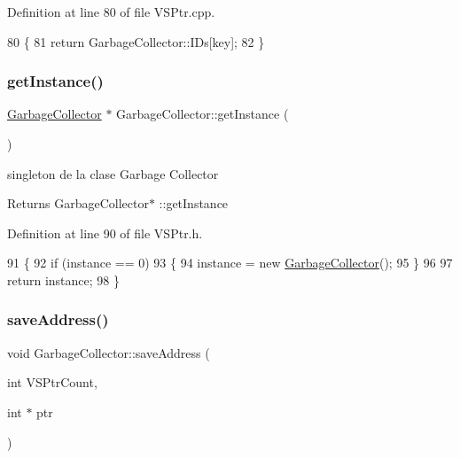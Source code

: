 Definition at line 80 of file V\+S\+Ptr.\+cpp.


\begin{DoxyCode}
80                                      \{
81     \textcolor{keywordflow}{return} GarbageCollector::IDs[key];
82 \}
\end{DoxyCode}
\mbox{\label{classGarbageCollector_ade4bccdf41223cc395b646db3f60ac8b}} 
\subsubsection{\texorpdfstring{get\+Instance()}{getInstance()}}
{\footnotesize\ttfamily \hyperlink{classGarbageCollector}{Garbage\+Collector} $\ast$ Garbage\+Collector\+::get\+Instance (\begin{DoxyParamCaption}{ }\end{DoxyParamCaption})\hspace{0.3cm}{\ttfamily [static]}}



singleton de la clase Garbage Collector 

\begin{DoxyReturn}{Returns}
Garbage\+Collector$\ast$ \+::get\+Instance 
\end{DoxyReturn}


Definition at line 90 of file V\+S\+Ptr.\+h.


\begin{DoxyCode}
91 \{
92     \textcolor{keywordflow}{if} (instance == 0)
93     \{
94         instance = \textcolor{keyword}{new} \hyperlink{classGarbageCollector}{GarbageCollector}();
95     \}
96 
97     \textcolor{keywordflow}{return} instance;
98 \}
\end{DoxyCode}
\mbox{\label{classGarbageCollector_aabb68414b8f72ca07aeb13ff7cc1d060}} 
\subsubsection{\texorpdfstring{save\+Address()}{saveAddress()}}
{\footnotesize\ttfamily void Garbage\+Collector\+::save\+Address (\begin{DoxyParamCaption}\item[{int}]{V\+S\+Ptr\+Count,  }\item[{int $\ast$}]{ptr }\end{DoxyParamCaption})}



